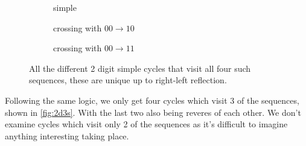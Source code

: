 \documentclass[11pt]{article}
\theoremstyle{nothm}
\begin{document}
\begin{figure}[H]
    \centering
    \begin{subfigure}[t]{0.3\textwidth}
        \centering
        \caption{simple}\label{fig:2d4ss}
    \end{subfigure}
    \begin{subfigure}[t]{0.3\textwidth}
        \centering
        \caption{crossing with $00\rightarrow10$}\label{fig:2d4sc1}
    \end{subfigure}
    \begin{subfigure}[t]{0.3\textwidth}
        \centering
        \caption{crossing with $00\rightarrow11$}\label{fig:2d4sc2}
    \end{subfigure}
    \caption{
        All the different 2 digit simple cycles that visit all four such sequences, these are unique up to right-left reflection.
    }\label{fig:2d4s}
\end{figure}

Following the same logic, we only get four cycles which visit 3 of the sequences, shown in \cref{fig:2d3s}.
With the last two also being reveres of each other.
We don't examine cycles which visit only 2 of the sequences as it's difficult to imagine anything interesting taking place.
\end{document}
